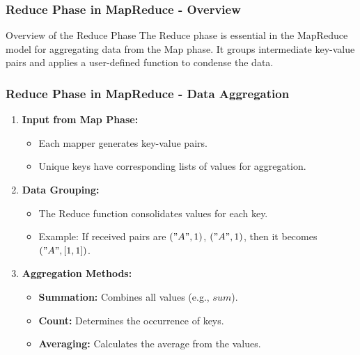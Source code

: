 \documentclass[aspectratio=169]{beamer}
\begin{document}
\begin{frame}[fragile]
    \frametitle{Reduce Phase in MapReduce - Overview}
    \begin{block}{Overview of the Reduce Phase}
        The Reduce phase is essential in the MapReduce model for aggregating data from the Map phase. It groups intermediate key-value pairs and applies a user-defined function to condense the data.
    \end{block}
\end{frame}

\begin{frame}[fragile]
    \frametitle{Reduce Phase in MapReduce - Data Aggregation}
    \begin{enumerate}
        \item \textbf{Input from Map Phase:}
        \begin{itemize}
            \item Each mapper generates key-value pairs.
            \item Unique keys have corresponding lists of values for aggregation.
        \end{itemize}
        
        \item \textbf{Data Grouping:}
        \begin{itemize}
            \item The Reduce function consolidates values for each key.
            \item Example: If received pairs are $("A", 1)$, $("A", 1)$, then it becomes $("A", [1, 1])$.
        \end{itemize}
        
        \item \textbf{Aggregation Methods:}
        \begin{itemize}
            \item \textbf{Summation:} Combines all values (e.g., $sum$).
            \item \textbf{Count:} Determines the occurrence of keys.
            \item \textbf{Averaging:} Calculates the average from the values.
        \end{itemize}
    \end{enumerate}
\end{frame}
\end{document}
